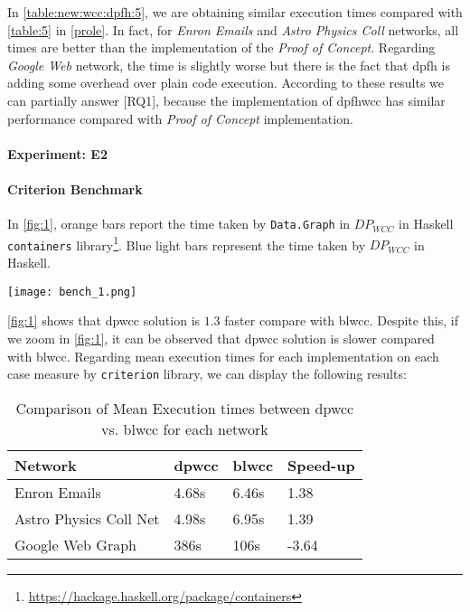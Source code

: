 In \autoref{table:new:wcc:dpfh:5}, we are obtaining similar execution times compared with \autoref{table:5} in \autoref{prole}.
In fact, for \textit{Enron Emails} and \textit{Astro Physics Coll} networks, all times are better than the implementation of the \textit{Proof of Concept}.
Regarding \textit{Google Web} network, the time is slightly worse but there is the fact that \acrshort{dpfh} is adding some overhead over plain code execution.
According to these results we can partially answer [RQ1], because the implementation of \acrshort{dpfhwcc} has similar performance compared with \textit{Proof of Concept} implementation. 

\paragraph{Experiment: E2}\label{sub:new:exp:2}
\paragraph{Criterion Benchmark}
In \autoref{fig:1}, orange bars report the time taken by \texttt{Data.Graph} in $DP_{WCC}$ in Haskell \texttt{containers} library\footnote{\url{https://hackage.haskell.org/package/containers}}. Blue light bars represent the time taken by $DP_{WCC}$ in Haskell.

\begin{minipage}[t]{\linewidth}
  \texttt{[image: bench\_1.png]}
  \captionsetup{type=figure}
  \label{fig:1}
\end{minipage}

\autoref{fig:1} shows that \acrshort{dpwcc} solution is $1.3$ faster compare with \acrshort{blwcc}. 
Despite this, if we zoom  in \autoref{fig:1}, it can be observed that \acrshort{dpwcc} solution is slower compared with \acrshort{blwcc}.
Regarding mean execution times for each implementation on each case measure by \texttt{criterion} library, we can display the following results:

\begin{table}[H]
  \centering
  \begin{tabular}{|l|l|l|l|}
   \hline
   \textbf{Network} & \textbf{\acrshort{dpwcc}} & \textbf{\acrshort{blwcc}} & \textbf{Speed-up}\\
   \hline
   Enron Emails & 4.68s &  6.46s & 1.38\\
   \hline
   Astro Physics Coll Net & 4.98s & 6.95s  & 1.39\\
   \hline
   Google Web Graph & 386s & 106s & -3.64\\
   \hline
  \end{tabular}
 \caption{Comparison of Mean Execution times between \acrshort{dpwcc} vs. \acrshort{blwcc} for each network}
 \label{table:6}
 \end{table}


